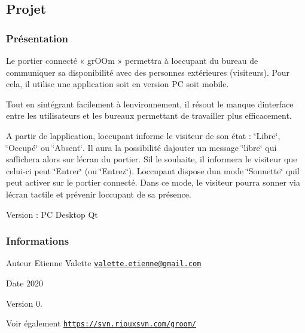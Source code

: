 \hypertarget{page__r_e_a_d_m_e_projet}{}\subsection{Projet}\label{page__r_e_a_d_m_e_projet}
\hypertarget{page__r_e_a_d_m_e_presentation}{}\subsubsection{Présentation}\label{page__r_e_a_d_m_e_presentation}
Le portier connecté «​ gr\+O\+Om​ » permettra à l\textquotesingle{}occupant du bureau de communiquer sa disponibilité avec des personnes extérieures (visiteurs). Pour cela, il utilise une application soit en version PC soit mobile.

Tout en s\textquotesingle{}intégrant facilement à l\textquotesingle{}environnement, il résout le manque d\textquotesingle{}interface entre les utilisateurs et les bureaux permettant de travailler plus efficacement.

A partir de l\textquotesingle{}application, l\textquotesingle{}occupant informe le visiteur de son état \+: \char`\"{}\+Libre\char`\"{}, \char`\"{}\+Occupé\char`\"{} ou \char`\"{}\+Absent\char`\"{}. Il aura la possibilité d\textquotesingle{}ajouter un message \char`\"{}libre\char`\"{} qui s\textquotesingle{}affichera alors sur l\textquotesingle{}écran du portier. S\textquotesingle{}il le souhaite, il informera le visiteur que celui-\/ci peut \char`\"{}\+Entrer\char`\"{} (ou \char`\"{}\+Entrez\char`\"{}). L\textquotesingle{}occupant dispose d\textquotesingle{}un mode \char`\"{}\+Sonnette\char`\"{} qu\textquotesingle{}il peut activer sur le portier connecté. Dans ce mode, le visiteur pourra sonner via l\textquotesingle{}écran tactile et prévenir l\textquotesingle{}occupant de sa présence.

Version \+: PC Desktop Qt\hypertarget{page__r_e_a_d_m_e_informations}{}\subsubsection{Informations}\label{page__r_e_a_d_m_e_informations}
\begin{DoxyAuthor}{Auteur}
Etienne Valette \href{mailto:valette.etienne@gmail.com}{\tt valette.\+etienne@gmail.\+com} 
\end{DoxyAuthor}
\begin{DoxyDate}{Date}
2020 
\end{DoxyDate}
\begin{DoxyVersion}{Version}
0. 
\end{DoxyVersion}
\begin{DoxySeeAlso}{Voir également}
\href{https://svn.riouxsvn.com/groom/}{\tt https\+://svn.\+riouxsvn.\+com/groom/} 
\end{DoxySeeAlso}
